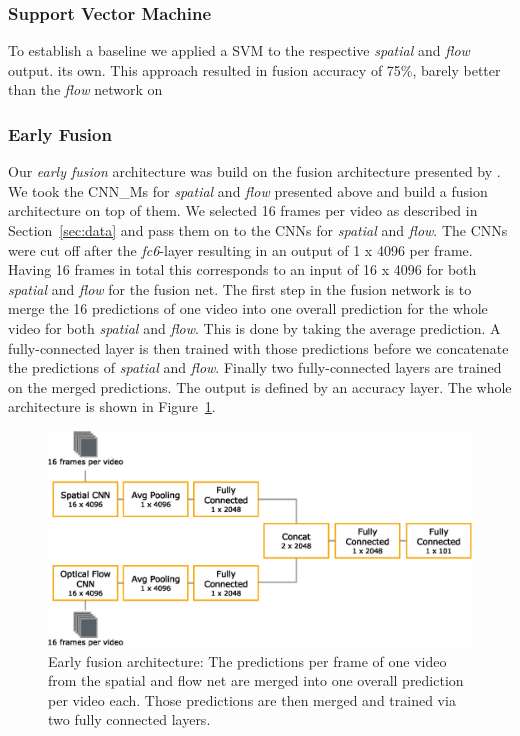 \subsubsection{Support Vector Machine}
To establish a baseline we applied a SVM to the respective \emph{spatial} and \emph{flow} output.
its own.
This approach resulted in fusion accuracy of 75\%, barely better than the \emph{flow} network on

\subsubsection{Early Fusion}
Our \emph{early fusion} architecture was build on the fusion architecture presented by .
We took the CNN\_Ms for \emph{spatial} and \emph{flow} presented above and build a fusion architecture on top of them.
We selected 16 frames per video as described in Section~\ref{sec:data} and pass them on to the CNNs for \emph{spatial} and \emph{flow}.
The CNNs were cut off after the \textit{fc6}-layer resulting in an output of 1 x 4096 per frame.
Having 16 frames in total this corresponds to an input of 16 x 4096 for both \emph{spatial} and \emph{flow} for the fusion net.
The first step in the fusion network is to merge the 16 predictions of one video into one overall prediction for the whole video for both \emph{spatial} and \emph{flow}.
This is done by taking the average prediction.
A fully-connected layer is then trained with those predictions before we concatenate the predictions of \emph{spatial} and \emph{flow}.
Finally two fully-connected layers are trained on the merged predictions.
The output is defined by an accuracy layer.
The whole architecture is shown in Figure~\ref{fig:early_fusion}.

\begin{figure}[!htb]
	\centering
	\includegraphics[scale=.7]{images/early_fusion.eps}
	\caption{Early fusion architecture: The predictions per frame of one video from the spatial and flow net are merged into one overall prediction per video each. Those predictions are then merged and trained via two fully connected layers.}
	\label{fig:early_fusion}
\end{figure}

